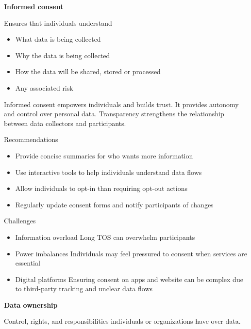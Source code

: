 \vspace{10pt}

\textbf{Informed consent}

\vspace{10pt}
Ensures that individuals understand

\begin{itemize}
    \item What data is being collected
    \item Why the data is being collected
    \item How the data will be shared, stored or processed
    \item Any associated risk
\end{itemize}

Informed consent empowers individuals and builds trust. It provides autonomy and control over personal data. Transparency strengthens the relationship between data collectors and participants.

\vspace{10pt}

Recommendations

\begin{itemize}
    \item Provide concise summaries for who wants more information
    \item Use interactive tools to help individuals understand data flows
    \item Allow individuals to opt-in than requiring opt-out actions
    \item Regularly update consent forms and notify participants of changes
\end{itemize}

Challenges

\begin{itemize}
    \item Information overload \ra Long TOS can overwhelm participants
    \item Power imbalances \ra Individuals may feel pressured to consent when services are essential
    \item Digital platforms \ra Ensuring consent on apps and website can be complex due to third-party tracking and unclear data flows
\end{itemize}

\vspace{10pt}
\textbf{Data ownership}
\vspace{10pt}

Control, rights, and responsibilities individuals or organizations have over data.

